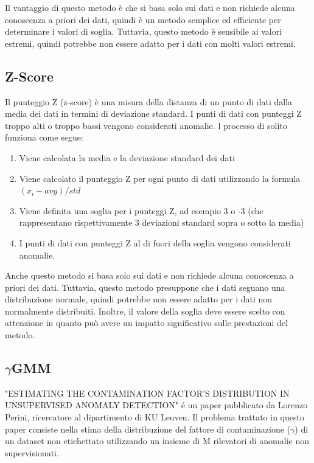 Il vantaggio di questo metodo è che si basa solo sui dati e non richiede alcuna conoscenza a priori dei dati, quindi è un metodo semplice ed efficiente per determinare i valori di soglia. Tuttavia, questo metodo è sensibile ai valori estremi, quindi potrebbe non essere adatto per i dati con molti valori estremi.

\subsection{Z-Score}
Il punteggio Z (z-score) è una misura della distanza di un punto di dati dalla media dei dati in termini di deviazione standard. I punti di dati con punteggi Z troppo alti o troppo bassi vengono considerati anomalie.
l processo di solito funziona come segue:
\begin{enumerate}
\item Viene calcolata la media e la deviazione standard dei dati
\item Viene calcolato il punteggio Z per ogni punto di dati utilizzando la formula $(x_i - avg) / std$
\item Viene definita una soglia per i punteggi Z, ad esempio 3 o -3 (che rappresentano rispettivamente 3 deviazioni standard sopra o sotto la media)
\item I punti di dati con punteggi Z al di fuori della soglia vengono considerati anomalie.
\end{enumerate}
Anche questo metodo si basa solo sui dati e non richiede alcuna conoscenza a priori dei dati. Tuttavia, questo metodo presuppone che i dati seguano una distribuzione normale, quindi potrebbe non essere adatto per i dati non normalmente distribuiti. Inoltre, il valore della soglia deve essere scelto con attenzione in quanto può avere un impatto significativo sulle prestazioni del metodo.


\subsection{$\gamma$GMM}
"ESTIMATING THE CONTAMINATION FACTOR’S DISTRIBUTION IN UNSUPERVISED ANOMALY DETECTION" é un paper pubblicato da Lorenzo Perini, ricercatore al dipartimento di KU Leuven.
Il problema trattato in questo paper consiste nella stima della distribuzione del fattore di contaminazione ($\gamma$) di un dataset non etichettato utilizzando un insieme di M rilevatori di anomalie non supervisionati. 

